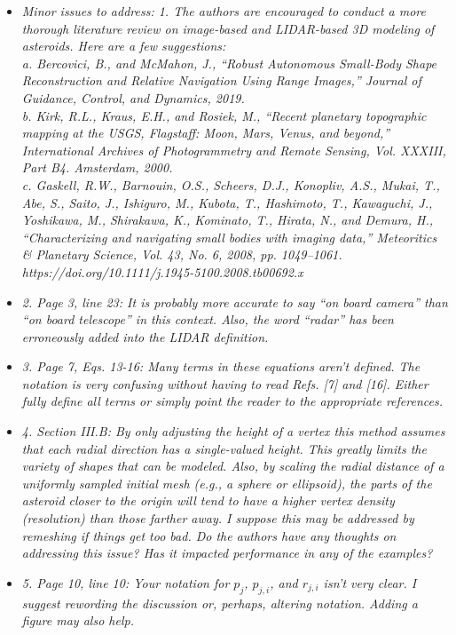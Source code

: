 \documentclass[11pt]{article}
\newcommand{\comment}[1]{\item \itshape #1 \normalfont}
\begin{document}
\begin{itemize}
\comment{Minor issues to address:
1.      The authors are encouraged to conduct a more thorough literature review on image-based and LIDAR-based 3D modeling of asteroids.  Here are a few suggestions:\\
a.      Bercovici, B., and McMahon, J., “Robust Autonomous Small-Body Shape Reconstruction and Relative Navigation Using Range Images,” Journal of Guidance, Control, and Dynamics, 2019.\\
b.      Kirk, R.L., Kraus, E.H., and Rosiek, M., “Recent planetary topographic mapping at the USGS, Flagstaff: Moon, Mars, Venus, and beyond,” International Archives of Photogrammetry and Remote Sensing, Vol. XXXIII, Part B4. Amsterdam, 2000.\\
c.      Gaskell, R.W., Barnouin, O.S., Scheers, D.J., Konopliv, A.S., Mukai, T., Abe, S., Saito, J., Ishiguro, M., Kubota, T., Hashimoto, T., Kawaguchi, J., Yoshikawa, M., Shirakawa, K., Kominato, T., Hirata, N., and Demura, H., “Characterizing and navigating small bodies with imaging data,” Meteoritics \& Planetary Science, Vol. 43, No. 6, 2008, pp. 1049–1061. https://doi.org/10.1111/j.1945-5100.2008.tb00692.x}

\comment{2.      Page 3, line 23: It is probably more accurate to say “on board camera” than “on board telescope” in this context. Also, the word “radar” has been erroneously added into the LIDAR definition.}

\comment{3.      Page 7, Eqs. 13-16: Many terms in these equations aren’t defined. The notation is very confusing without having to read Refs. [7] and [16]. Either fully define all terms or simply point the reader to the appropriate references.}

\comment{4.      Section III.B: By only adjusting the height of a vertex this method assumes that each radial direction has a single-valued height. This greatly limits the variety of shapes that can be modeled. Also, by scaling the radial distance of a uniformly sampled initial mesh (e.g., a sphere or ellipsoid), the parts of the asteroid closer to the origin will tend to have a higher vertex density (resolution) than those farther away. I suppose this may be addressed by remeshing if things get too bad. Do the authors have any thoughts on addressing this issue? Has it impacted performance in any of the examples?}

\comment{5.      Page 10, line 10: Your notation for $p_j$, $p_{j,i}$, and $r_{j,i}$  isn’t very clear. I suggest rewording the discussion or, perhaps, altering notation. Adding a figure may also help. }


\end{itemize}
\end{document}
